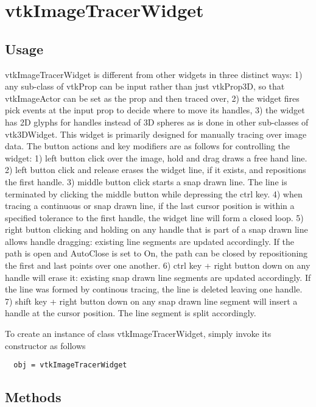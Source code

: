 \section{vtkImageTracerWidget}

\subsection{Usage}

 vtkImageTracerWidget is different from other widgets in three distinct ways:
 1) any sub-class of vtkProp can be input rather than just vtkProp3D, so that
 vtkImageActor can be set as the prop and then traced over, 2) the widget fires
 pick events at the input prop to decide where to move its handles, 3) the
 widget has 2D glyphs for handles instead of 3D spheres as is done in other
 sub-classes of vtk3DWidget. This widget is primarily designed for manually
 tracing over image data.
 The button actions and key modifiers are as follows for controlling the
 widget:
 1) left button click over the image, hold and drag draws a free hand line.
 2) left button click and release erases the widget line,
 if it exists, and repositions the first handle.
 3) middle button click starts a snap drawn line.  The line is terminated by 
 clicking the middle button while depressing the ctrl key.
 4) when tracing a continuous or snap drawn line, if the last cursor position
 is within a specified tolerance to the first handle, the widget line will form
 a closed loop.
 5) right button clicking and holding on any handle that is part of a snap
 drawn line allows handle dragging: existing line segments are updated
 accordingly.  If the path is open and AutoClose is set to On, the path can
 be closed by repositioning the first and last points over one another.
 6) ctrl key + right button down on any handle will erase it: existing
 snap drawn line segments are updated accordingly.  If the line was formed by
 continous tracing, the line is deleted leaving one handle.
 7) shift key + right button down on any snap drawn line segment will insert
 a handle at the cursor position.  The line segment is split accordingly.

To create an instance of class vtkImageTracerWidget, simply
invoke its constructor as follows
\begin{verbatim}
  obj = vtkImageTracerWidget
\end{verbatim}
\subsection{Methods}

